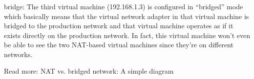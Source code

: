 bridge: The third virtual machine (192.168.1.3) is configured in “bridged” mode which basically means that the virtual network adapter in that virtual machine is bridged to the production network and that virtual machine operates as if it exists directly on the production network. In fact, this virtual machine won’t even be able to see the two NAT-based virtual machines since they’re on different networks.

Read more: NAT vs. bridged network: A simple diagram
